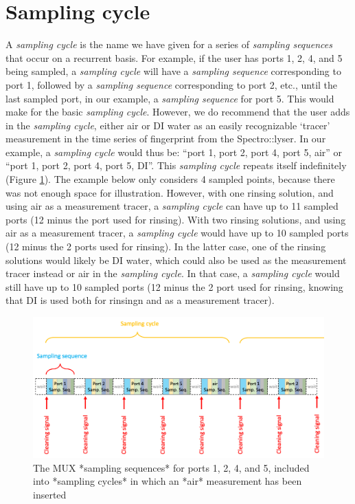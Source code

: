 \documentclass[]{book}
\begin{document}
\hypertarget{sampling-cycle}{%
\section{Sampling cycle}\label{sampling-cycle}}

A \emph{sampling cycle} is the name we have given for a series of \emph{sampling sequences} that occur on a recurrent basis. For example, if the user has ports 1, 2, 4, and 5 being sampled, a \emph{sampling cycle} will have a \emph{sampling sequence} corresponding to port 1, followed by a \emph{sampling sequence} corresponding to port 2, etc., until the last sampled port, in our example, a \emph{sampling sequence} for port 5. This would make for the basic \emph{sampling cycle}. However, we do recommend that the user adds in the \emph{sampling cycle}, either air or DI water as an easily recognizable `tracer' measurement in the time series of fingerprint from the Spectro::lyser. In our example, a \emph{sampling cycle} would thus be: ``port 1, port 2, port 4, port 5, air'' or ``port 1, port 2, port 4, port 5, DI''. This \emph{sampling cycle} repeats itself indefinitely (Figure \ref{fig:SamplingCycle}). The example below only considers 4 sampled points, because there was not enough space for illustration. However, with one rinsing solution, and using air as a measurement tracer, a \emph{sampling cycle} can have up to 11 sampled ports (12 minus the port used for rinsing). With two rinsing solutions, and using air as a measurement tracer, a \emph{sampling cycle} would have up to 10 sampled ports (12 minus the 2 ports used for rinsing). In the latter case, one of the rinsing solutions would likely be DI water, which could also be used as the measurement tracer instead or air in the \emph{sampling cycle}. In that case, a \emph{sampling cycle} would still have up to 10 sampled ports (12 minus the 2 port used for rinsing, knowing that DI is used both for rinsingn and as a measurement tracer).

\begin{figure}

{\centering \includegraphics[width=1\linewidth]{pictures/SamplingCycle} 

}

\caption{The MUX *sampling sequences* for ports 1, 2, 4, and 5, included into *sampling cycles* in which an *air* measurement has been inserted}\label{fig:SamplingCycle}
\end{figure}
\end{document}
